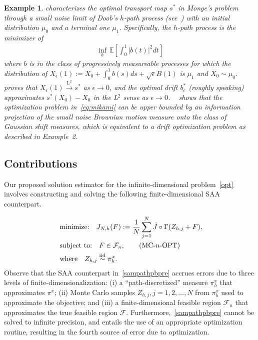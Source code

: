 \documentclass[11pt,leqno]{amsart}
\newtheorem{example}{Example}
\begin{document}
\begin{example}
\cite{mikami2004monge} characterizes the optimal transport map $s^*$ in Monge's problem~\citep{villani2009optimal} through a small noise limit of Doob's $h$-path process (see~\citep[Sec. 39]{rogerswilliams}) with an initial distribution $\mu_0$ and a terminal one $\mu_1$. Specifically, the $h$-path process is the minimizer of 
\begin{align} \label{eq:mikami}
\inf_b \, \mathbb E \left[ \int_0^1 |b(t)|^2 dt \right]
\end{align}
where $b$ is in the class of progressively measureable processes for which the distribution of $X_\epsilon (1) := X_0 + \int_0^1 b(s) ds + \sqrt{\epsilon} B(1)$ is $\mu_1$ and $X_0 \sim \mu_0$. \citep[Theorem 2.2]{mikami2004monge} proves that $X_\epsilon(1) \stackrel{\text{L}^2}{\to} s^*$ as $\epsilon \to 0$, and the optimal drift $b^*_\epsilon$ (roughly speaking) approximates $s^*(X_0) - X_0$ in the L$^2$ sense as $\epsilon \to 0$. ~\citep[Theorem 1.1]{selk2021information} shows that the optimization problem in~\eqref{eq:mikami} can be upper bounded by an information projection of the small noise Brownian motion measure onto the class of Gaussian shift measures, which is equivalent to a drift optimization problem as described in Example~2.
\end{example}

\subsection{Contributions}
Our proposed solution estimator for the infinite-dimensional problem~\eqref{opt} involves constructing and solving the following finite-dimensional SAA counterpart. 

\begin{align}\label{sampathpbpre}
~& \mbox{minimize:} \quad J_{N,h}(F) := \frac{1}{N} \sum_{j=1}^N \tilde{J}\circ \Gamma(Z_{h,j}+F), \nonumber\\ 
~& \mbox{subject to:} \quad F \in \mathcal{F}_n, \tag{MC-$n$-OPT}\\
~&\text{where}\quad Z_{h,j}\overset{\scriptsize \mbox{iid}}{\sim} \pi^x_{h}. \nonumber 
\end{align} Observe that the SAA counterpart in~\eqref{sampathpbpre} accrues errors due to three levels of finite-dimensionalization: (i) a ``path-discretized'' measure $\pi^x_h$ that approximates $\pi^x$; (ii) Monte Carlo samples $Z_{h,j}, j =1,2, \ldots, N$ from $\pi^x_h$ used to approximate the objective; and (iii) a finite-dimensional feasible region $\mathcal{F}_n$ that approximates the true feasible region $\mathcal{F}$. Furthermore,~\eqref{sampathpbpre} cannot be solved to infinite precision, and entails the use of an appropriate optimization routine, resulting in the fourth source of error due to optimization. 
\end{document}

